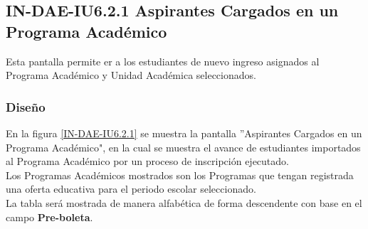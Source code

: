 \subsection{IN-DAE-IU6.2.1 Aspirantes Cargados en un Programa Académico}

Esta pantalla permite er a los estudiantes de nuevo ingreso asignados al Programa Académico y Unidad Académica seleccionados.

\subsubsection{Diseño}

En la figura \ref{IN-DAE-IU6.2.1} se muestra la pantalla ''Aspirantes Cargados en un Programa Académico", en la cual se muestra el avance de estudiantes importados al Programa Académico por un proceso de inscripción ejecutado. \\

Los Programas Académicos mostrados son los Programas que tengan registrada una oferta educativa para el periodo escolar seleccionado.\\

La tabla será mostrada de manera alfabética de forma descendente con base en el campo {\bf Pre-boleta}.


